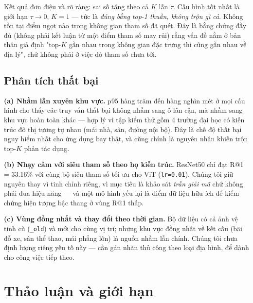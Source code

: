 \documentclass[11pt]{article}
\begin{document}
Kết quả đơn điệu và rõ ràng: sai số tăng theo cả $K$ lẫn $\tau$. Cấu hình tốt nhất là giới hạn $\tau \to 0$, $K = 1$ --- tức là \emph{đúng bằng top-1 thuần, không trộn gì cả}. Không tồn tại điểm ngọt nào trong không gian tham số đã quét. Đây là bằng chứng đầy đủ (không phải kết luận từ một điểm tham số may rủi) rằng vấn đề nằm ở bản thân giả định "top-$K$ gần nhau trong không gian đặc trưng thì cũng gần nhau về địa lý", chứ không phải ở việc dò tham số chưa tới.

\subsection{Phân tích thất bại}

\textbf{(a) Nhầm lẫn xuyên khu vực.} p95 hàng trăm đến hàng nghìn mét ở mọi cấu hình cho thấy các truy vấn thất bại không nhầm sang ô lân cận, mà nhầm sang khu vực hoàn toàn khác --- hợp lý vì tập kiểm thử gồm 4 trường đại học có kiến trúc đô thị tương tự nhau (mái nhà, sân, đường nội bộ). Đây là chế độ thất bại nguy hiểm nhất cho ứng dụng bay thật, và cũng chính là nguyên nhân khiến trộn top-$K$ phản tác dụng.

\textbf{(b) Nhạy cảm với siêu tham số theo họ kiến trúc.} ResNet50 chỉ đạt R@1 = 33.16\% với cùng bộ siêu tham số tối ưu cho ViT (\texttt{lr=0.01}). Chúng tôi giữ nguyên thay vì tinh chỉnh riêng, vì mục tiêu là khảo sát \emph{trần giải mã} chứ không phải đua hiệu năng --- và một mô hình yếu lại là điểm dữ liệu hữu ích để kiểm chứng hiện tượng bậc thang ở vùng R@1 thấp.

\textbf{(c) Vùng đồng nhất và thay đổi theo thời gian.} Bộ dữ liệu có cả ảnh vệ tinh cũ (\texttt{\_old}) và mới cho cùng vị trí; những khu vực đồng nhất về kết cấu (bãi đỗ xe, sân thể thao, mái phẳng lớn) là nguồn nhầm lẫn chính. Chúng tôi chưa định lượng riêng yếu tố này --- cần gán nhãn thủ công theo loại địa hình, để dành cho công việc tiếp theo.

\section{Thảo luận và giới hạn}
\end{document}
